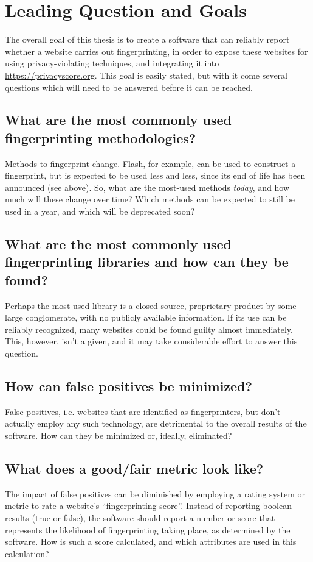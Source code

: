 \documentclass[
    fontsize=12pt,
    headings=small,
    parskip=half,
    bibliography=totoc,
    numbers=noenddot,
    open=any
    ]{scrreprt}
\begin{document}

\begingroup
\renewcommand{\cleardoublepage}{}
\renewcommand{\clearpage}{}
\chapter{Leading Question and Goals} %
\endgroup

The overall goal of this thesis is to create a software that can reliably report whether a website carries out
fingerprinting, in order to expose these websites for using privacy-violating techniques, and integrating it into
\url{https://privacyscore.org}.
This goal is easily stated, but with it come several questions which will need to be answered before
it can be reached.

\section{What are the most commonly used fingerprinting methodologies?}
Methods to fingerprint change. Flash, for example, can be used to construct a fingerprint, but is expected
to be used less and less, since its end of life has been announced (see above).
So, what are the most-used methods \textit{today}, and how much will these change over time? Which methods
can be expected to still be used in a year, and which will be deprecated soon?

\section{What are the most commonly used fingerprinting libraries and how can they be found?}
Perhaps the most used library is a closed-source, proprietary product by some large conglomerate,
with no publicly available information. If its use can be reliably recognized, many websites could be found guilty
almost immediately. This, however, isn't a given, and it may take considerable effort to answer this question.

\section{How can false positives be minimized?}
False positives, i.e. websites that are identified as fingerprinters, but don't actually employ any such technology,
are detrimental to the overall results of the software. How can they be minimized or, ideally, eliminated?

\section{What does a good/fair metric look like?}
The impact of false positives can be diminished by employing a rating system or metric to rate a website's
``fingerprinting score''. Instead of reporting boolean results (true or false), the software should
report a number or score that represents the likelihood of fingerprinting taking place, as determined by the software.
How is such a score calculated, and which attributes are used in this calculation?
\end{document}
